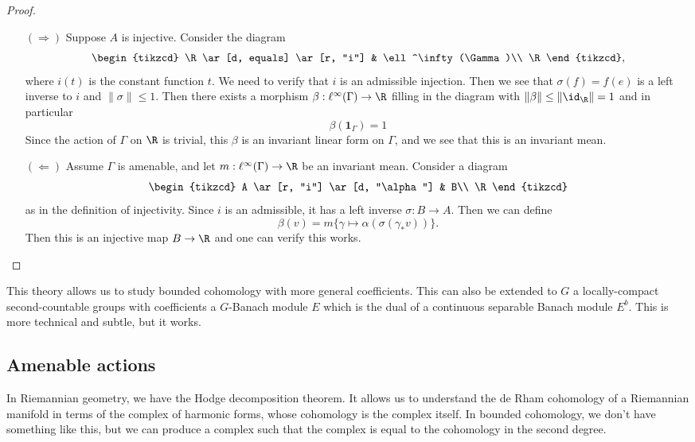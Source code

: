 \documentclass[a4paper]{article}
\begin{document}
\begin{proof}\leavevmode
  \begin{itemize}
    \item[$(\Rightarrow)$] Suppose $A$ is injective. Consider the diagram
      \[
        \begin{tikzcd}
          \R \ar[d, equals] \ar[r, "i"] & \ell^\infty(\Gamma)\\
          \R
        \end{tikzcd},
      \]
      where $i(t)$ is the constant function $t$. We need to verify that $i$ is an admissible injection. Then we see that $\sigma(f) = f(e)$ is a left inverse to $i$ and $\|\sigma\| \leq 1$. Then there exists a morphism $\beta: \ell^\infty(\Gamma) \to \R$ filling in the diagram with $\|\beta\| \leq \|\id_\R\| = 1$ and in particular
      \[
        \beta(\mathbf{1}_\Gamma) = 1
      \]
      Since the action of $\Gamma$ on $\R$ is trivial, this $\beta$ is an invariant linear form on $\Gamma$, and we see that this is an invariant mean.
    \item[$(\Leftarrow)$] Assume $\Gamma$ is amenable, and let $m: \ell^\infty(\Gamma) \to \R$ be an invariant mean. Consider a diagram
      \[
        \begin{tikzcd}
          A \ar[r, "i"] \ar[d, "\alpha"] & B\\
          \R
        \end{tikzcd}
      \]
      as in the definition of injectivity. Since $i$ is an admissible, it has a left inverse $\sigma: B \to A$. Then we can define
      \[
        \beta(v) = m \{\gamma \mapsto \alpha(\sigma(\gamma_* v))\}.
      \]
      Then this is an injective map $B \to \R$ and one can verify this works.
  \end{itemize}
\end{proof}

This theory allows us to study bounded cohomology with more general coefficients. This can also be extended to $G$ a locally-compact second-countable groups with coefficients a $G$-Banach module $E$ which is the dual of a continuous separable Banach module $E^b$. This is more technical and subtle, but it works.

\subsection{Amenable actions}
In Riemannian geometry, we have the Hodge decomposition theorem. It allows us to understand the de Rham cohomology of a Riemannian manifold in terms of the complex of harmonic forms, whose cohomology is the complex itself. In bounded cohomology, we don't have something like this, but we can produce a complex such that the complex is equal to the cohomology in the second degree.
\end{document}
